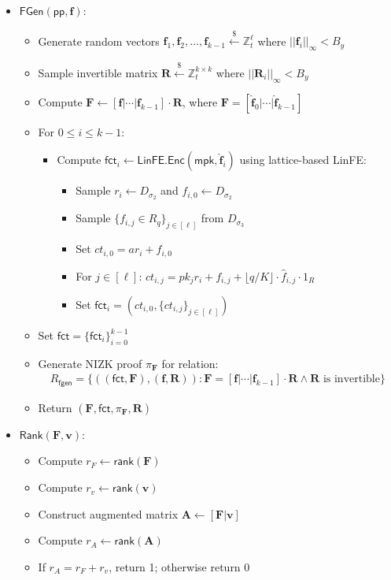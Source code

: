 \begin{itemize}
\item $\mathsf{FGen}(\mathsf{pp},\mathbf{f})$:
\begin{itemize}
    \item Generate random vectors $\mathbf{f}_1, \mathbf{f}_2, \ldots, \mathbf{f}_{k-1} \stackrel{\$}{\leftarrow}\mathbb{Z}_t^\ell$ where $||\mathbf{f}_i||_\infty < B_y$
    \item Sample invertible matrix $\mathbf{R}\stackrel{\$}{\leftarrow} \mathbb{Z}_t^{k\times k}$ where $||\mathbf{R}_i||_\infty < B_y$
    \item Compute $\mathbf{F} \leftarrow [\mathbf{f}|\cdots|\mathbf{f}_{k-1}]\cdot \mathbf{R}$, where $\mathbf{F}=[\mathbf{\hat{f}}_0|\cdots|\mathbf{\hat{f}}_{k-1}]$
    \item For $0\leq i\leq k-1$:
    \begin{itemize}
        \item Compute $\mathsf{fct}_i \leftarrow \mathsf{LinFE.Enc}(\mathsf{mpk}, \mathbf{\hat{f}}_i)$ using lattice-based LinFE:
        \begin{itemize}
            \item Sample $r_i \leftarrow D_{\sigma_2}$ and $f_{i,0} \leftarrow D_{\sigma_2}$
            \item Sample $\{f_{i,j} \in R_q \}_{j \in [\ell]}$ from $D_{\sigma_3}$
            \item Set $ct_{i,0} = ar_i + f_{i,0}$
            \item For $j \in [\ell]$: $ct_{i,j} = pk_j r_i + f_{i,j} + \lfloor q/K \rfloor \cdot \hat{f}_{i,j} \cdot 1_R$
            \item Set $\mathsf{fct}_i = (ct_{i,0}, \{ct_{i,j}\}_{j \in [\ell]})$
        \end{itemize}
    \end{itemize}
    \item Set $\mathsf{fct}=\{\mathsf{fct}_i\}_{i=0}^{k-1}$
    \item Generate NIZK proof $\pi_{\mathbf{F}}$ for relation:
    \begin{align*}
    R_{\mathsf{fgen}} = \{((\mathsf{fct},\mathbf{F}), (\mathbf{f},\mathbf{R})) : \mathbf{F} = [\mathbf{f}|\cdots|\mathbf{f}_{k-1}]\cdot \mathbf{R} \land \mathbf{R} \text{ is invertible}\}
    \end{align*}
    \item Return $(\mathbf{F},\mathsf{fct},\pi_\mathbf{F},\mathbf{R})$
\end{itemize}

\item $\mathsf{Rank}(\mathbf{F},\mathbf{v})$:
\begin{itemize}
    \item Compute $r_F \leftarrow \mathsf{rank}(\mathbf{F})$
    \item Compute $r_v \leftarrow \mathsf{rank}(\mathbf{v})$
    \item Construct augmented matrix $\mathbf{A} \leftarrow [\mathbf{F}|\mathbf{v}]$
    \item Compute $r_A \leftarrow \mathsf{rank}(\mathbf{A})$
    \item If $r_A = r_F + r_v$, return 1; otherwise return 0
\end{itemize}


\end{itemize}
